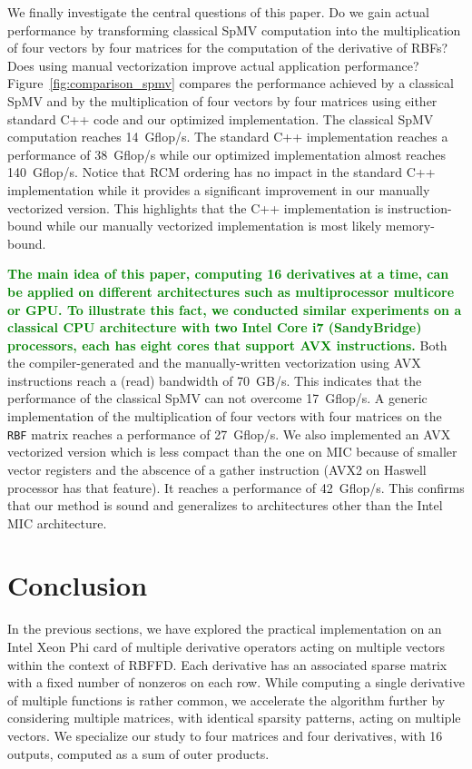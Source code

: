 \documentclass{sig-alternate}
\def\green#1{\textbf{\textcolor{green}{#1}}}
\def\ee#1{{\green{#1}}}
\begin{document}
We finally investigate the central questions of this paper. Do we gain
actual performance by transforming classical SpMV computation into the
multiplication of four vectors by four matrices for the computation of the
derivative of RBFs? Does using manual vectorization improve actual
application performance? Figure~\ref{fig:comparison_spmv} compares the
performance achieved by a classical SpMV and by the multiplication of
four vectors by four matrices using either standard C++ code and our
optimized implementation. The
classical SpMV computation reaches 14~Gflop/s. 
The standard C++ implementation reaches a performance of 38~Gflop/s while our
optimized implementation almost reaches 140~Gflop/s. 
Notice that 
RCM ordering has no impact in the standard C++ implementation while it
provides a significant improvement in our manually vectorized
version. This highlights that the C++ implementation is instruction-bound
while our manually vectorized implementation is most likely 
memory-bound. 

\ee{The main idea of this paper, computing 16 derivatives at a time,
  can be applied on different architectures such as multiprocessor
  multicore or GPU. To illustrate this fact, we conducted similar
  experiments on a classical CPU architecture with two Intel Core i7
  (SandyBridge) processors, each has eight cores that support AVX
  instructions.}  Both the compiler-generated and the manually-written
vectorization using AVX instructions reach a (read) bandwidth of
70~GB/s. This indicates that the performance of the classical SpMV can
not overcome 17~Gflop/s. A generic implementation of the
multiplication of four vectors with four matrices on the {\tt RBF}
matrix reaches a performance of 27~Gflop/s. We also implemented an AVX
vectorized version which is less compact than the one on MIC because
of smaller vector registers and the abscence of a gather instruction
(AVX2 on Haswell processor has that feature). It reaches a
performance of 42~Gflop/s. This confirms that our method is sound and
generalizes to architectures other than the Intel MIC architecture.

\vspace{-0.5em}
\section{Conclusion}
\label{sec:ccl}

In the previous sections, we have explored the practical
implementation on an Intel Xeon Phi card of multiple derivative
operators acting on multiple vectors within the context of
RBFFD. Each derivative has an associated sparse matrix with a fixed
number of nonzeros on each row. While computing a single derivative of
multiple functions is rather common, we accelerate the algorithm further 
by considering multiple
matrices, with identical sparsity patterns, acting on multiple vectors. 
We specialize our study to four matrices and four derivatives,
with 16 outputs, computed as a sum of outer products.
\end{document}
